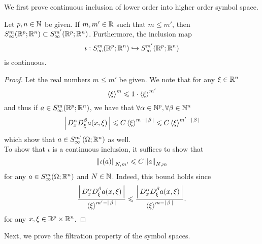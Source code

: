 \documentclass[12pt]{article}
\begin{document}
We first prove continuous inclusion of lower order into higher order symbol space. 
\begin{fprop}
    Let $p, n \in \N$ be given. If $m, m' \in \R$ such that $m \leq m'$, then $S^m_\infty(\R^p; \R^n) \subset S^{m'}_\infty(\R^p; \R^n)$. Furthermore, the inclusion map 
    \begin{align*}
        \iota: S^m_\infty(\R^p; \R^n) \hookrightarrow S^{m'}_\infty(\R^p; \R^n)
    \end{align*}
    is continuous. 
\end{fprop}
\begin{proof}
    Let the real numbers $m \leq m'$ be given. We note that for any $\xi \in \R^n$
    \[
    \sym[\xi]^m \leq 1 \cdot \sym[\xi]^{m'}
    \]
    and thus if $a \in S^{m}_\infty(\R^p; \R^n)$, we have that $\forall \alpha \in \N^p, \forall \beta \in \N^n$
    \[
    \abs{D^\alpha_x D^\beta_\xi a(x, \xi)} \leq C \sym[\xi]^{m - \abs{\beta}} \leq C \sym[\xi]^{m' - \abs{\beta}} 
    \]
    which show that $a \in S^{m'}_\infty(\Omega; \R^n)$ as well. \\
    
    To show that $\iota$ is a continuous inclusion, it suffices to show that 
    \[
    \norm[\iota(a)]_{N, m'} \leq C \norm[a]_{N, m}
    \]
    for any $a \in S^{m}_\infty(\Omega; \R^n)$ and $N \in \N$. Indeed, this bound holds since 
    \[
    \frac{\abs{D^\alpha_x D^\beta_\xi a(x, \xi)}}{\sym[\xi]^{m' - \abs{\beta}}}  
    \leq \frac{\abs{D^\alpha_x D^\beta_\xi a(x, \xi)}}{\sym[\xi]^{m - \abs{\beta}}}. 
    \]
    for any $x, \xi \in \R^p \times \R^n$. 
    
\end{proof}

Next, we prove the filtration property of the symbol spaces. 
\end{document}
